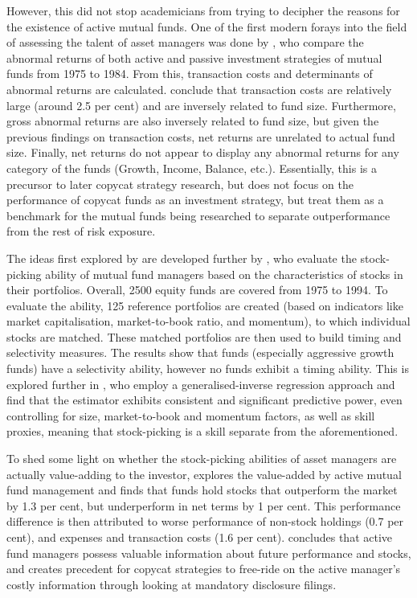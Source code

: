 \documentclass[12pt, a4]{article}
\begin{document}
However, this did not stop academicians from trying to decipher the reasons for the existence of active mutual funds. One of the first modern forays into the field of assessing the talent of asset managers was done by \cite{grinblatt}, who compare the abnormal returns of both active and passive investment strategies of mutual funds from 1975 to 1984. From this, transaction costs and determinants of abnormal returns are calculated. \citeauthor{grinblatt} conclude that transaction costs are relatively large (around 2.5 per cent) and are inversely related to fund size. Furthermore, gross abnormal returns are also inversely related to fund size, but given the previous findings on transaction costs, net returns are unrelated to actual fund size. Finally, net returns do not appear to display any abnormal returns for any category of the funds (Growth, Income, Balance, etc.). Essentially, this is a precursor to later copycat strategy research, but does not focus on the performance of copycat funds as an investment strategy, but treat them as a benchmark for the mutual funds being researched to separate outperformance from the rest of risk exposure.

The ideas first explored by \cite{grinblatt} are developed further by \cite{daniel}, who evaluate the stock-picking ability of mutual fund managers based on the characteristics of stocks in their portfolios. Overall, 2500 equity funds are covered from 1975 to 1994. To evaluate the ability, 125 reference portfolios are created (based on indicators like market capitalisation, market-to-book ratio, and momentum), to which individual stocks are matched. These matched portfolios are then used to build timing and selectivity measures. The results show that funds (especially aggressive growth funds) have a selectivity ability, however no funds exhibit a timing ability. This is explored further in \cite{wermers_2012}, who employ a generalised-inverse regression approach and find that the estimator exhibits consistent and significant predictive power, even controlling for size, market-to-book and momentum factors, as well as skill proxies, meaning that stock-picking is a skill separate from the aforementioned.

To shed some light on whether the stock-picking abilities of asset managers are actually value-adding to the investor, \cite{wermers_2000} explores the value-added by active mutual fund management and finds that funds hold stocks that outperform the market by 1.3 per cent, but underperform in net terms by 1 per cent. This performance difference is then attributed to worse performance of non-stock holdings (0.7 per cent), and expenses and transaction costs (1.6 per cent). \citeauthor{wermers_2000} concludes that active fund managers possess valuable information about future performance and stocks, and creates precedent for copycat strategies to free-ride on the active manager's costly information through looking at mandatory disclosure filings.
\end{document}
